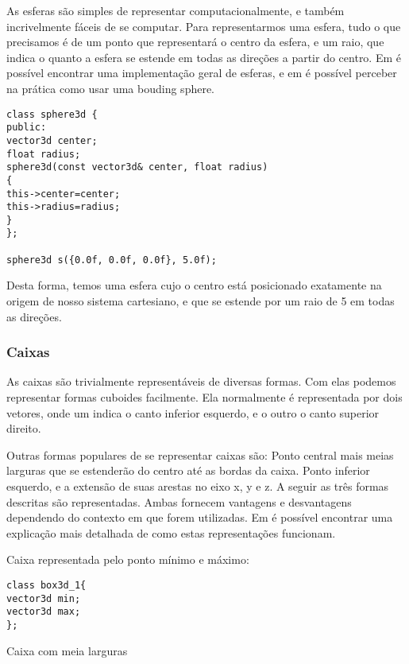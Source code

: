 As esferas são simples de representar computacionalmente, e também
incrivelmente fáceis de se computar. Para representarmos uma esfera, tudo o que
precisamos é de um ponto que representará o centro da esfera, e um raio, que
indica o quanto a esfera se estende em todas as direções a partir do centro.
Em  é possível encontrar uma implementação geral de esferas, e em  é possível perceber na prática como usar uma bouding sphere.

\begin{lstlisting}[frame=single,caption=Representação de esfera\label{code:sphere3d}]
class sphere3d {
public:
vector3d center;
float radius;
sphere3d(const vector3d& center, float radius)
{
this->center=center;
this->radius=radius;
}
};

sphere3d s({0.0f, 0.0f, 0.0f}, 5.0f);
\end{lstlisting}

Desta forma, temos uma esfera cujo o centro está posicionado exatamente na origem de
nosso sistema cartesiano, e que se estende por um raio de 5 em todas as
direções.

\subsubsection{Caixas}

As caixas são trivialmente representáveis de diversas formas. Com elas podemos
representar formas cuboides facilmente. Ela normalmente é representada por dois
vetores, onde um indica o canto inferior esquerdo, e o outro o canto superior direito.

Outras formas populares de se representar caixas são:
Ponto central mais meias larguras que se estenderão do centro até as bordas da caixa.
Ponto inferior esquerdo, e a extensão de suas arestas no eixo x, y e z.
A seguir as três formas descritas são representadas. Ambas fornecem vantagens e
desvantagens dependendo do contexto em que forem utilizadas.
Em  é possível encontrar uma explicação mais detalhada de como estas representações funcionam.

Caixa representada pelo ponto mínimo e máximo:

\begin{lstlisting}[frame=single,caption=Representação de caixa\label{code:box3d_1}]
class box3d_1{
vector3d min;
vector3d max;
};
\end{lstlisting}

Caixa com meia larguras

